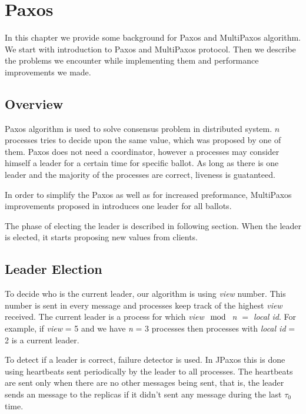 \chapter{Paxos}

In this chapter we provide some background for Paxos and MultiPaxos algorithm. We start with introduction to Paxos and MultiPaxos protocol. Then we describe the problems we encounter while implementing them and performance improvements we made.

\section{Overview}
Paxos algorithm is used to solve consensus problem in distributed system. $n$ processes tries to decide upon the same value, which was proposed by one of them. Paxos does not need a coordinator, however a processes may consider himself a leader for a certain time for specific ballot. As long as there is one leader and the majority of the processes are correct, liveness is guatanteed.

In order to simplify the Paxos as well as for increased preformance, MultiPaxos improvements proposed in \cite{Lam01} introduces one leader for all ballots.

The phase of electing the leader is described in following section. When the leader is elected, it starts proposing new values from clients.

\section{Leader Election}
\label{sec:leader_election}
\indent\par

To decide who is the current leader, our algorithm is using \textit{view} number. This number is sent in every message and processes keep track of the highest \textit{view} received. The current leader is a process for which \textit{view $\mod$ n $=$ local id}. For example, if \textit{view} = 5 and we have \textit{n} = 3 processes then processes with \textit{local id} = 2 is a current leader.

To detect if a leader is correct, failure detector is used. In JPaxos this is done using heartbeats sent periodically by the leader to all processes. The heartbeats are sent only when there are no other messages being sent, that is, the leader sends an \alive message to the replicas if it didn't sent any message during the last $\tau_0$ time.

